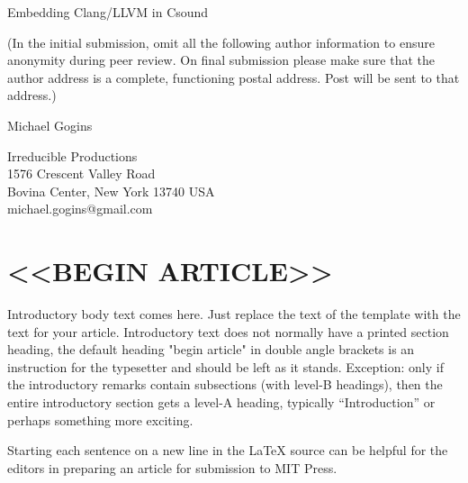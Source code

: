 \documentclass[letterpaper, 12pt]{article}
\begin{document}
{\cmjTitle Embedding Clang/LLVM in Csound}
\vspace*{24pt}

(In the initial submission, omit all the following author information to ensure anonymity during peer review.
On final submission please make sure that the author address is a complete, functioning postal address.
Post will be sent to that address.)

{\cmjAuthor Michael Gogins}	%
 
\begin{cmjAuthorAddress}
	Irreducible Productions\\
	1576 Crescent Valley Road\\
	Bovina Center, New York 13740 USA\\		%
	michael.gogins@gmail.com
\end{cmjAuthorAddress}


\begin{abstract}
I present new opcodes for the Csound computer music system that embed 
the Clang/LLVM on-request compiler (ORC). C or C++ source code may be 
embedded in a regular Csound orchestra file, compiled by the \texttt{clang\_compile} opcode, and invoked during performance by the 
\texttt{clang\_invoke} opcode. The technology and patterns implemented 
here could be adapted for use in other computer music systems that are 
written in C or C++.
\end{abstract}

\section{<<BEGIN ARTICLE>>}
Introductory body text comes here. 
Just replace the text of the template with the text for your article.
Introductory text does not normally have a printed section heading, the default heading "begin article" in double angle brackets is an instruction for the typesetter and should be left as it stands.
Exception: only if the introductory remarks contain subsections (with level-B headings), then the entire introductory section gets a level-A heading, typically ``Introduction'' or perhaps something more exciting.

Starting each sentence on a new line in the LaTeX source can be helpful for the editors in preparing an article for submission to MIT Press.
\end{document}
